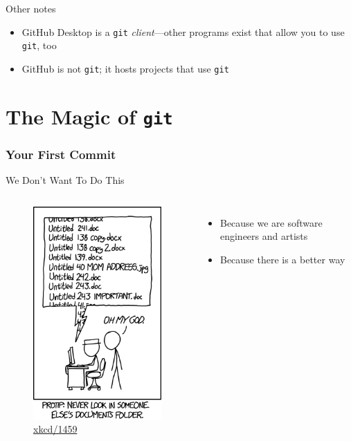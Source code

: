 \documentclass{beamer}
\theoremstyle{example}
\newcommand{\xkcd}[1]{\href{https://xkcd.com/#1}{xkcd/#1}}
\begin{document}
\begin{frame}{Other notes}
    \begin{itemize}
        \item GitHub Desktop is a \texttt{git} \emph{client}---other programs
            exist that allow you to use \texttt{git}, too
        \item GitHub is not \texttt{git}; it hosts projects that use
            \texttt{git}
    \end{itemize}
\end{frame}

\part{The Magic of \texttt{git}}
\frame{\partpage}
\frame{\tableofcontents[part=2]}

\section{Your First Commit}
\begin{frame}{We Don't Want To Do This}
    \begin{columns}
        \begin{figure}
            \includegraphics[scale=0.4]{img/documents}
            \caption{\xkcd{1459}}
        \end{figure}

        \begin{itemize}
            \item Because we are software engineers and artists
            \item Because there is a better way
        \end{itemize}
    \end{columns}
\end{frame}
\end{document}
